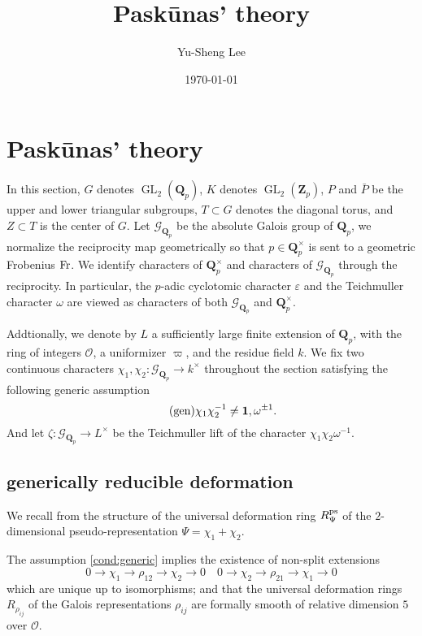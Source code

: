 \documentclass[leqno]{amsart}
\newcommand{\Gp}{\mathcal{G}_{\Qp}} %
\newcommand{\Fr}{\textnormal{Fr}} %
\newcommand{\ps}{\textnormal{ps}}
\DeclareMathOperator{\GL}{GL}
\newcommand{\Qp}{\mathbf{Q}_p}
\newcommand{\Zp}{\mathbf{Z}_p}
\newcommand{\oo}{\mathcal O}
\newcommand{\id}{\mathbf{1}}
\newcommand{\1}{\mathbf{1}}
\theoremstyle{definition}
\theoremstyle{remark}
\begin{document}
\title{Pask\={u}nas' theory}
\author[Y-S.~Lee]{Yu-Sheng Lee}
\address{Department of Mathematics, University  of Michigan, Ann Arbor, MI 48109, USA}
\date{\today}

\maketitle
\setcounter{tocdepth}{1}
\tableofcontents




\section{Pask\={u}nas' theory}

In this section,
$G$ denotes  $\GL_2(\Qp)$, 
$K$ denotes  $\GL_2(\Zp)$,  
$P$ and  $\bar{P}$ 
be the upper and lower triangular subgroups,
$T\subset G$ denotes the diagonal torus,
and  $Z\subset T$ is the center of  $G$.
Let  $\Gp$ be the absolute Galois group of  $\Qp$,
we normalize the reciprocity map  geometrically
so that  $p\in \Qp^\times$
is sent to a geometric Frobenius  $\Fr$.
We identify characters of  $\Qp^\times$
and characters of  $\Gp$ through the reciprocity.
In particular, 
the $p$-adic cyclotomic character $\varepsilon$ 
and the Teichmuller character $\omega$
are viewed as characters of both  $\Gp$ and  $\Qp^\times$.

Addtionally,
we denote by $L$ a sufficiently large 
finite extension of  $\Qp$,
with the ring of integers  $\oo$,
a uniformizer  $\varpi$,
and the residue field $k$.
We fix 
two continuous characters
$\chi_1,\chi_2\colon \Gp\to k^\times$ 
throughout the section satisfying
the following generic assumption
\begin{equation}\label{cond:generic}\tag{\text{gen}}
	\chi_1\chi_2^{-1}\neq \id,\omega^{\pm1}.
\end{equation}
And let $\zeta\colon \Gp\to L^\times$
be the Teichmuller lift of the character  $\chi_1\chi_2\omega^{-1}$.



\subsection{generically reducible deformation}

We recall from \cite[\S B.1]{pask}
the structure of the universal deformation ring $R_{\Psi}^{\ps}$
of the $2$-dimensional pseudo-representation $\Psi=\chi_1+\chi_2$. 

The assumption \eqref{cond:generic}
implies the existence of non-split extensions
\begin{equation*}
    0\to \chi_1\to \rho_{12}\to \chi_2\to 0\quad
    0\to \chi_2\to \rho_{21}\to \chi_1\to 0
\end{equation*}
which are unique up to isomorphisms;
and that the universal deformation rings
$R_{\rho_{ij}}$ of the Galois representations $\rho_{ij}$
are formally smooth of relative dimension $5$ over $\oo$.
\end{document}
